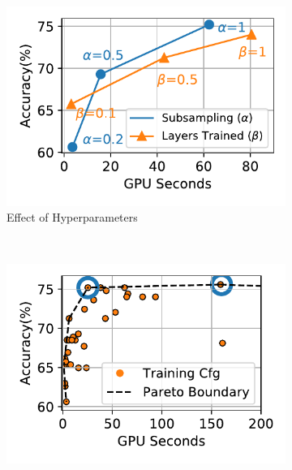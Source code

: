 
\begin{figure}[t]
  \centering
   \begin{subfigure}[t]{0.47\linewidth}
    \centering
    \includegraphics[width=\linewidth]{ekya/figures/motivation/AccuracyResourceProfile/jena_hypparams.pdf}
    \caption{Effect of Hyperparameters}
    \label{fig:hyparam-zoom}
  \end{subfigure}
  ~~~
  \begin{subfigure}[t]{0.48\linewidth}
    \centering
    \includegraphics[width=\linewidth]{ekya/figures/motivation/AccuracyResourceProfile/jena.pdf}

\end{subfigure}
\end{figure}

